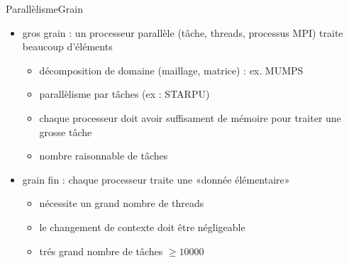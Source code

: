 \documentclass[11pt,mathserif]{beamer}
\newcommand{\hand}{\faHandORight}
\newcommand{\argi}{\faLightbulbO}
\begin{document}
\begin{frame}{Parallèlisme}{Grain}
\begin{itemize}[<+->]
  \item[\faTruck] gros grain : un processeur parallèle (tâche, threads, processus MPI) traite beaucoup d'éléments 
   \begin{itemize}
     \item décomposition de domaine (maillage, matrice) :  ex. MUMPS
     \item parallèlisme par tâches (ex : STARPU)
     \item[\hand] chaque processeur doit avoir suffisament de mémoire pour traiter une grosse tâche
     \item[\argi] nombre raisonnable de tâches
   \end{itemize}
 \item[\faBicycle] grain fin : chaque processeur traite une «donnée élémentaire»
   \begin{itemize}
     \item[\hand] nécessite un grand nombre de threads
     \item[\hand] le changement de contexte doit être négligeable
     \item[\argi] trés grand nombre de tâches $\geqslant 10000$
   \end{itemize}
\end{itemize}
\end{frame}
\end{document}
